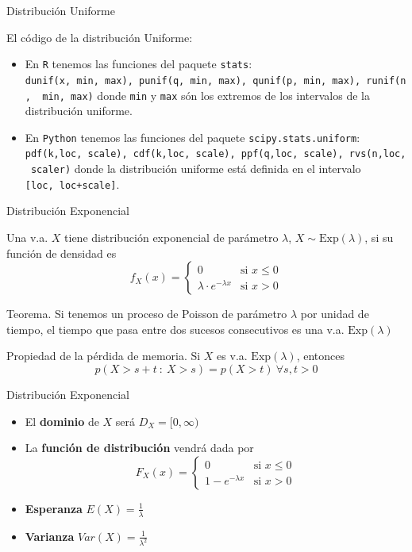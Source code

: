 \documentclass[
  ignorenonframetext,
]{beamer}
\providecommand{\tightlist}{%
  \setlength{\itemsep}{0pt}\setlength{\parskip}{0pt}}
\begin{document}
\begin{frame}[fragile]{Distribución Uniforme}
\protect\hypertarget{distribuciuxf3n-uniforme-3}{}

El código de la distribución Uniforme:

\begin{itemize}
\tightlist
\item
  En \texttt{R} tenemos las funciones del paquete \texttt{stats}:
  \texttt{dunif(x,\ min,\ max),\ punif(q,\ min,\ max),\ qunif(p,\ min,\ max),\ runif(n,\ \ min,\ max)}
  donde \texttt{min} y \texttt{max} són los extremos de los intervalos
  de la distribución uniforme.
\item
  En \texttt{Python} tenemos las funciones del paquete
  \texttt{scipy.stats.uniform}:
  \texttt{pdf(k,loc,\ scale),\ cdf(k,loc,\ scale),\ ppf(q,loc,\ scale),\ rvs(n,loc,\ scaler)}
  donde la distribución uniforme está definida en el intervalo
  \texttt{{[}loc,\ loc+scale{]}}.
\end{itemize}

\end{frame}

\begin{frame}{Distribución Exponencial}
\protect\hypertarget{distribuciuxf3n-exponencial}{}

Una v.a. \(X\) tiene distribución exponencial de parámetro \(\lambda\),
\(X\sim\text{Exp}(\lambda)\), si su función de densidad es
\[f_X(x)=\left\{
\begin{array}{rl}
     0 & \text{si }  x\le 0
  \\ \lambda\cdot e^{-\lambda x} & \text{si }x>0
\end{array}
\right.\]

Teorema. Si tenemos un proceso de Poisson de parámetro \(\lambda\) por
unidad de tiempo, el tiempo que pasa entre dos sucesos consecutivos es
una v.a. \(\text{Exp}(\lambda)\)

Propiedad de la pérdida de memoria. Si \(X\) es v.a.
\(\text{Exp}(\lambda)\), entonces
\[p(X>s+t\ :\ X>s)=p(X>t)\ \forall s,t>0\]

\end{frame}

\begin{frame}{Distribución Exponencial}
\protect\hypertarget{distribuciuxf3n-exponencial-1}{}

\begin{itemize}
\item
  El \textbf{dominio} de \(X\) será \(D_X = [0,\infty)\)
\item
  La \textbf{función de distribución} vendrá dada por \[F_X(x)=\left\{
  \begin{array}{rl}
    0 & \text{si } x\le 0
  \\ 1-e^{-\lambda x} & \text{si } x>0
  \end{array}
  \right.\]
\item
  \textbf{Esperanza} \(E(X) = \frac{1}{\lambda}\)
\item
  \textbf{Varianza} \(Var(X) = \frac{1}{\lambda^2}\)
\end{itemize}

\end{frame}
\end{document}
